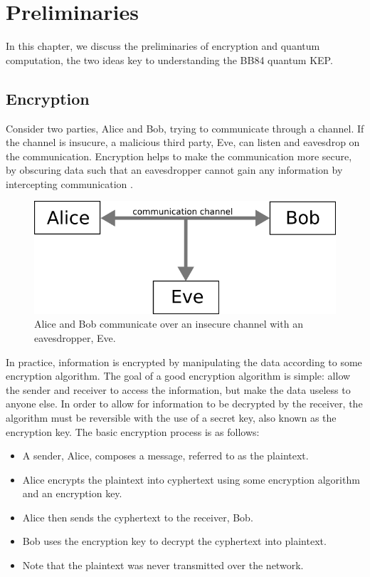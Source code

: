 \chapter{Preliminaries}
\label{chap:background}

In this chapter, we discuss the preliminaries of encryption and quantum computation, the two ideas key to understanding the BB84 quantum KEP.


\section{Encryption}
Consider two parties, Alice and Bob, trying to communicate through a channel.
If the channel is insucure, a malicious third party, Eve, can listen and eavesdrop on the communication.
Encryption helps to make the communication more secure, by obscuring data such that an eavesdropper cannot gain any information by intercepting communication \cite{encrypt}.

\begin{figure}[htp]
\centering
\includegraphics[scale=0.4]{images/classical_communication.png}
\caption{Alice and Bob communicate over an insecure channel with an eavesdropper, Eve.}
\label{foo bar}
\end{figure}

In practice, information is encrypted by manipulating the data according to some encryption algorithm.
The goal of a good encryption algorithm is simple: allow the sender and receiver to access the information, but make the data useless to anyone else.
In order to allow for information to be decrypted by the receiver, the algorithm must be reversible with the use of a secret key, also known as the encryption key.
The basic encryption process is as follows:

\begin{itemize}
\item A sender, Alice, composes a message, referred to as the plaintext.
\item Alice encrypts the plaintext into cyphertext using some encryption algorithm and an encryption key.
\item Alice then sends the cyphertext to the receiver, Bob.
\item Bob uses the encryption key to decrypt the cyphertext into plaintext.
\item Note that the plaintext was never transmitted over the network.
\end{itemize}

